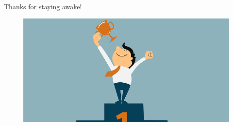 \documentclass{beamer}
\begin{document}
\begin{frame}[focus]
	Thanks for staying awake!\\ [0.4cm]
	\begin{figure}
		\centering
		\includegraphics[width=0.7\linewidth]{"Images/Thank you"}
		\caption{}
		\label{fig:thank-you}
	\end{figure}
	
\end{frame}


\appendix


%
%

\end{document}
